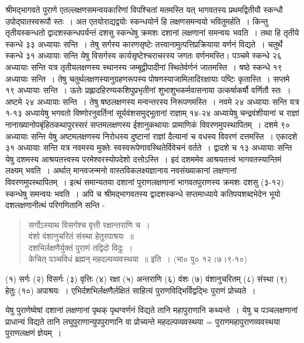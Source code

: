 {श्रीमद्भागवते पुराणे एतल्लक्षणसमन्वयकारिणां विपश्चितां मतमस्ति यत् भागवतस्य प्रथमद्वितीयौ स्कन्धौ उपोद्घातस्वरूपौ स्तः~। अत एतयोराद्यद्वयोः स्कन्धयोर्न हि लक्षणसमन्वयो भवितुमर्हति~। किन्तु तृतीयस्कन्धतो द्वादशस्कन्धपर्यन्तं दशसु स्कन्धेषु क्रमशः दशानां लक्षणानां समन्वयः भवति~। तथा हि तृतीये स्कन्धे ३३ अध्यायाः सन्ति~। तेषु सर्गस्य कारणसृष्टेः तत्त्वानामुत्पत्तिप्रक्रियाया वर्णनं विद्यते~। चतुर्थे स्कन्धे ३१ अध्यायाः सन्ति येषु विसर्गस्य कार्यसृष्टेश्चराचरस्य जगतः वर्णनमस्ति। पञ्चमे स्कन्धे २६ अध्यायाः सन्ति यत्र तृतीयलक्षणस्य स्थानस्य जम्बूद्वीपादीनां स्थितेर्वर्णनं जातमस्ति~। षष्ठे स्कन्धे १९ अध्यायाः सन्ति~। तेषु चतुर्थलक्षणस्यानुग्रहणरूपस्य पोषणस्याजामिलादिरक्षायाः पष्टिः कृतास्ति~। सप्तमे १९ अध्यायाः सन्ति~। ऊतेः प्रह्लादहिरण्यकशिपुप्रभृतीनां शुभाशुभकर्मवासनाया उत्कर्षाकर्षौ वर्णितौ स्तः~। अष्टमे २४ अध्यायाः सन्ति~। तेषु षष्ठलक्षणस्य मन्वन्तरस्य निरूपणमस्ति~। नवमे २४ अध्यायाः सन्ति यत्र १-१३ अध्यायेषु भगवतो विष्णोरनुवर्तिनां सूर्यवंशसमुद्भूतानां राज्ञाम् १४-२४ अध्यायेषु चन्द्रवंशीयानां च राज्ञां नानाख्यानोपबृंहितकथापुरस्सरं सप्तमलक्षणस्य ईशानुकथायाः प्रामाणिकं विवरणमुपस्थापितम्~। दशमे ९० अध्यायाः सन्ति येषु अष्टमलक्षणस्य निरोधस्य दुष्टानां राज्ञां दैत्यानां च वधस्य विवरणं दत्तमस्ति~। एकादशे ३१ अध्यायाः सन्ति यत्र नवमस्य मुक्तेः स्वस्वरूपेणावस्थितेर्विवेचनं वर्तते~। द्वादशे च १३ अध्यायाः सन्ति येषु दशमस्य आश्रयतत्त्वस्य परमेश्वरस्योपदेशो दत्तोऽस्ति~। इदं दशममेव आश्रयतत्त्वं भागवतस्यान्तिमं लक्ष्यम् भवति~। अर्थात् मानवजन्मनो वास्तविकलक्ष्यज्ञानाय नवसंख्याकानां लक्षणानां विवरणमुपस्थापितम्~। इत्थं समान्यतया दशानां पुराणलक्षणानां भागवतपुराणस्य क्रमशः दशसु (३-१२) स्कन्धेषु समन्वयः भवति~। अपि च श्रीमद्भागवतस्य द्वादशस्कन्धे सप्तमाध्याये कतिपयशब्दभेदेन भूयो दशलक्षणानीत्थं परिगणितानि सन्ति -
\begin{verse}
सर्गोऽस्याथ विसर्गश्च वृत्ती रक्षान्तराणि च~।\\
वंशो वंशानुचरितं संस्था हेतुरपाश्रयः~॥\\
दशभिर्लक्षणैर्युक्तं पुराणं तद्विदो विदुः~।\\
केचित् पञ्चविधं ब्रह्मन् महदल्पव्यवस्थया~॥ इति~। (भा० पु० १२।७।९-१०)
\end{verse}
(१) सर्गः (२) विसर्गः (३) वृत्तिः (४) रक्षा (५) अन्तराणि (६) वंशः (७) वंशानुचरितम् (८) संस्था (९) हेतुः (१०) अपाश्रयः~। एभिर्दशभिर्लक्षणैर्लक्षितं साहित्यं पुराणविद्भिर्विद्वद्भिः पुराणं प्रोच्यते~।

येषु पुराणेष्वेषां दशानां लक्षणानां पृथक् पृथग्वर्णनं विद्यते तानि महापुराणानि कथ्यन्ते~। येषु च पञ्चलक्षणानां प्राधान्यं विद्यते तानि लघुपुराणान्युपपुराणानि वा प्रोच्यन्ते महदल्पव्यवस्थया = पुराणमहापुराणव्यवस्थया पुराणलक्षणं ज्ञेयम्~।

}
